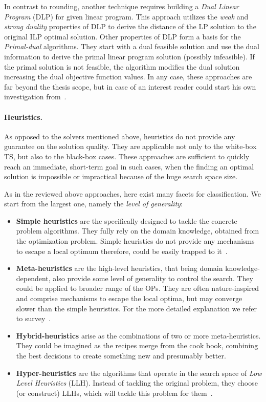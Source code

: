 In contrast to rounding, another technique requires building a \emph{Dual Linear Program} (DLP) for given linear program. This approach utilizes the \emph{weak} and \emph{strong duality} properties of DLP to derive the distance of the LP solution to the original ILP optimal solution. Other properties of DLP form a basis for the \emph{Primal-dual} algorithms. They start with a dual feasible solution and use the dual information to derive the primal linear program solution (possibly infeasible). If the primal solution is not feasible, the algorithm modifies the dual solution increasing the dual objective function values. In any case, these approaches are far beyond the thesis scope, but in case of an interest reader could start his own investigation from~\cite{williamson2011design}. 

\paragraph{Heuristics.} As opposed to the solvers mentioned above, heuristics do not provide any guarantee on the solution quality. They are applicable not only to the white-box TS, but also to the black-box cases. These approaches are sufficient to quickly reach an immediate, short-term goal in such cases, when the finding an optimal solution is impossible or impractical because of the huge search space size.

As in the reviewed above approaches, here exist many facets for classification.
We start from the largest one, namely the \textit{level of generality}:
\begin{itemize}
	\item \textbf{Simple heuristics} are the specifically designed to tackle the concrete problem algorithms. They fully rely on the domain knowledge, obtained from the optimization problem. Simple heuristics do not provide any mechanisms to escape a local optimum therefore, could be easily trapped to it~\cite{pearl1984intelligent}.
	
	\item \textbf{Meta-heuristics} are the high-level heuristics, that being domain knowledge-dependent, also provide some level of generality to control the search. They could be applied to broader range of the OPs. They are often nature-inspired and comprise mechanisms to escape the local optima, but may converge slower than the simple heuristics. For the more detailed explanation we refer to survey~\cite{bianchi2009survey}.
	
	\item \textbf{Hybrid-heuristics} arise as the combinations of two or more meta-heuristics. They could be imagined as the recipes merge from the cook book, combining the best decisions to create something new and presumably better.
	
	\item \textbf{Hyper-heuristics} are the algorithms that operate in the search space of \emph{Low Level Heuristics} (LLH). Instead of tackling the original problem, they choose (or construct) LLHs, which will tackle this problem for them~\cite{burke2003hyper}. 
\end{itemize}

